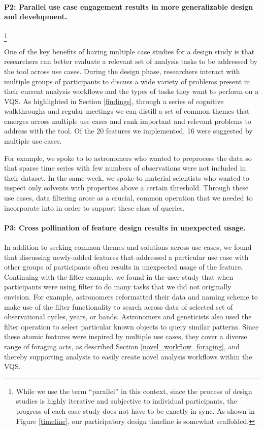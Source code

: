 {\paragraph{P2: Parallel use case engagement results in more generalizable design and development.}
\footnote{While we use the term ``parallel'' in this context, since the process of design studies is highly iterative and subjective to individual participants, the progress of each case study does not have to be exactly in sync. As shown in Figure \ref{timeline}, our participatory design timeline is somewhat scaffolded.} 
\par One of the key benefits of having multiple case studies for a design study is that researchers can better evaluate a relevant set of analysis tasks to be addressed by the tool across use cases. During the design phase, researchers interact with multiple groups of participants to discuss a wide variety of problems present in their current analysis workflows and the types of tasks they want to perform on a VQS. As highlighted in Section \ref{findings}, through a series of cognitive walkthroughs and regular meetings we can distill a set of common themes that emerges across multiple use cases and rank important and relevant problems to address with the tool. Of the 20 features we implemented, 16 were suggested by multiple use cases. 
\par For example, we spoke to to astronomers who wanted to preprocess the data so that sparse time series with few numbers of observations were not included in their dataset. In the same week, we spoke to material scientists who wanted to inspect only solvents with properties above a certain threshold. Through these use cases, data filtering arose as a crucial, common operation that we needed to incorporate into \zv in order to support these class of queries.
\paragraph{P3: Cross pollination of feature design results in unexpected usage.}
In addition to seeking common themes and solutions across use cases, we found that discussing newly-added features that addressed a particular use case with other groups of participants often results in unexpected usage of the feature. Continuing with the filter example, we found in the user study that when participants were using filter to do many tasks that we did not originally envision. For example, astronomers reformatted their data and naming scheme to make use of the filter functionality to search across data of selected set of observational cycles, years, or bands. Astronomers and geneticists also used the filter operation to select particular known objects to query similar patterns. Since these atomic features were inspired by multiple use cases, they cover a diverse range of foraging acts, as described Section \ref{novel_workflow_foraging}, and thereby supporting analysts to easily create novel analysis workflows within the VQS.
}
